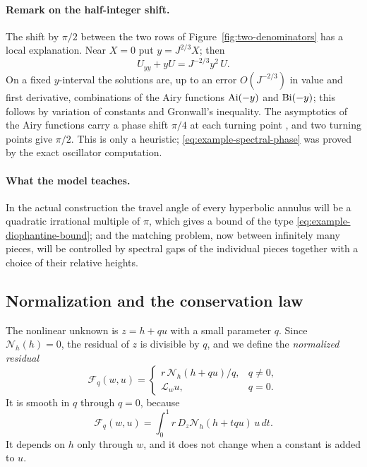 \paragraph{Remark on the half-integer shift.}
The shift by $\pi/2$ between the two rows of
Figure~\ref{fig:two-denominators} has a local explanation. Near $X=0$
put $y=J^{2/3}X$; then
\[
 U_{yy}+yU=J^{-2/3}y^2\,U .
\]
On a fixed $y$-interval the solutions are, up to an error
$O(J^{-2/3})$ in value and first derivative, combinations of the Airy
functions $\operatorname{Ai}(-y)$ and $\operatorname{Bi}(-y)$; this follows by variation of
constants and Gronwall's inequality. The asymptotics of the Airy
functions carry a phase shift $\pi/4$ at each turning point
\cite[9.7.5--9.7.12]{DLMFAiry}, and two turning points give $\pi/2$.
This is only a heuristic; \eqref{eq:example-spectral-phase} was proved
by the exact oscillator computation.

\paragraph{What the model teaches.}
In the actual construction the travel angle of every hyperbolic
annulus will be a quadratic irrational multiple of $\pi$, which gives
a bound of the type \eqref{eq:example-diophantine-bound}; and the
matching problem, now between infinitely many pieces, will be
controlled by spectral gaps of the individual pieces together with a
choice of their relative heights.

\subsection{Normalization and the conservation law}
\label{subsec:normalization}

The nonlinear unknown is $z=h+qu$ with a small parameter $q$. Since
$\mathcal N_h(h)=0$, the residual of $z$ is divisible by $q$, and we
define the \emph{normalized residual}
\begin{equation}\label{eq:cart-removable-equation}
 \mathcal F_q(w,u)=
 \begin{cases}r\,\mathcal N_h(h+qu)/q,&q\ne0,\\[2pt]
 \mathscr L_wu,&q=0.
 \end{cases}
\end{equation}
It is smooth in $q$ through $q=0$, because
\begin{equation}\label{eq:normalized-integral}
 \mathcal F_q(w,u)=\int_0^1 r\,D_z\mathcal N_h(h+tqu)\,u\,dt .
\end{equation}
It depends on $h$ only through $w$, and it does not change when a
constant is added to $u$.


